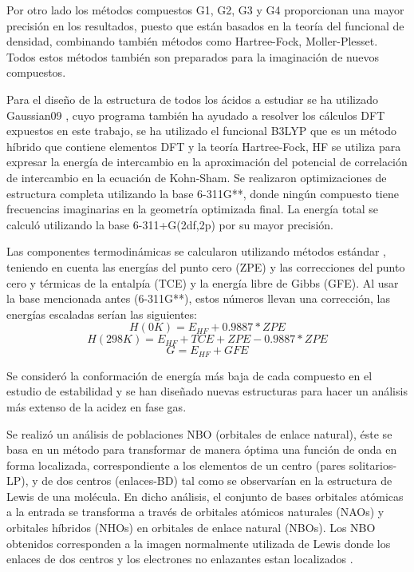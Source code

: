 Por otro lado los métodos compuestos G1, G2, G3 y G4 \cite{quimica11} proporcionan una mayor precisión en los resultados, puesto que están basados en la teoría del funcional de densidad, combinando también métodos como Hartree-Fock, Moller-Plesset.
Todos estos métodos también son preparados para la imaginación de nuevos compuestos.

Para el diseño de la estructura de todos los ácidos a estudiar se ha utilizado Gaussian09 \cite{Gaussian}, cuyo programa también ha ayudado a resolver los cálculos DFT expuestos en este trabajo, se ha utilizado el funcional B3LYP \cite{quimica10} \cite{quimica9} que es un método híbrido que contiene elementos DFT y la teoría Hartree-Fock, HF se utiliza para expresar la energía de intercambio en la aproximación del potencial de correlación de intercambio en la ecuación de Kohn-Sham. Se realizaron optimizaciones de estructura completa utilizando la base 6-311G**, donde ningún compuesto tiene frecuencias imaginarias en la geometría optimizada final. La energía total se calculó utilizando la base 6-311+G(2df,2p) por su mayor precisión.


Las componentes termodinámicas se calcularon utilizando métodos estándar \cite {quimica4}, teniendo en cuenta las energías del punto cero (ZPE) y las correcciones del punto cero y térmicas de la entalpía (TCE) y la energía libre de Gibbs (GFE). Al usar la base mencionada antes (6-311G**), estos números llevan una corrección, las energías escaladas serían las siguientes: \\
$$ H (0K) = E_{HF} + 0.9887*ZPE $$ 
$$ H (298K) = E_{HF} + TCE + ZPE - 0.9887*ZPE $$ 
$$G = E_{HF} + GFE $$

Se consideró la conformación de energía más baja de cada compuesto en el estudio de estabilidad y se han diseñado nuevas estructuras para hacer un análisis más extenso de la acidez en fase gas.

Se realizó un análisis de poblaciones NBO (orbitales de enlace natural), éste se basa en un método para transformar de manera óptima una función de onda en forma localizada, correspondiente a los elementos de un centro (pares solitarios-LP), y de dos centros (enlaces-BD) tal como se observarían en la estructura de Lewis de una molécula. En dicho análisis, el conjunto de bases orbitales atómicas a la entrada se transforma a través de orbitales atómicos naturales (NAOs) y orbitales híbridos (NHOs) en orbitales de enlace natural (NBOs). Los NBO obtenidos corresponden a la imagen normalmente utilizada de Lewis donde los enlaces de dos centros y los electrones no enlazantes estan localizados \cite{quimica8} \cite{quimica8}.

